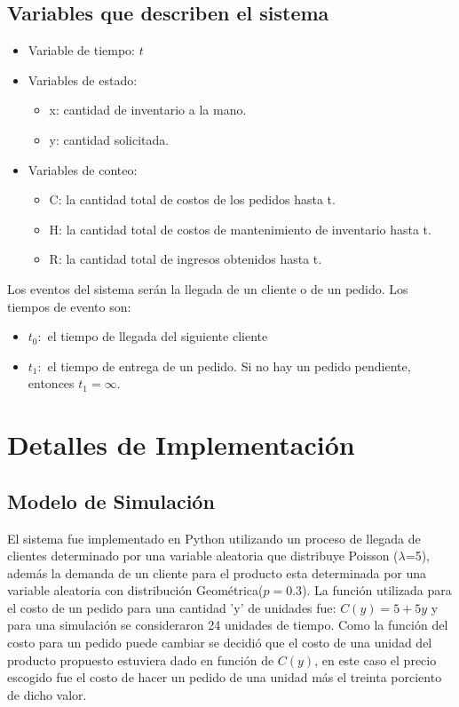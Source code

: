 \documentclass{article}
\begin{document}
\subsection{Variables que describen el sistema}
\begin{itemize}
    \item Variable de tiempo: $t$
    \item Variables de estado:
          \begin{itemize}
            \item x: cantidad de inventario a la mano.
            \item y: cantidad solicitada.
          \end{itemize}
    \item Variables de conteo:
          \begin{itemize}
            \item C: la cantidad total de costos de los pedidos hasta t.
            \item H: la cantidad total de costos de mantenimiento de inventario hasta t.
            \item R: la cantidad total de ingresos obtenidos hasta t.
          \end{itemize}

\end{itemize}

Los eventos del sistema serán la llegada de un cliente o de un pedido. 
Los tiempos de evento son:
\begin{itemize}
    \item $t_0:$ el tiempo de llegada del siguiente cliente
    \item $t_1:$ el tiempo de entrega de un pedido. Si no hay un pedido pendiente, entonces $t_1 = \infty$.
\end{itemize}

\newpage
\section{Detalles de Implementación}

\subsection{Modelo de Simulación}
El sistema fue implementado en Python utilizando un proceso de llegada de clientes determinado 
por una variable aleatoria que distribuye Poisson ($\lambda$=5), además la demanda de un cliente para el producto
esta determinada por una variable aleatoria con distribución Geométrica($p=0.3$). La función utilizada para el costo
de un pedido para una cantidad 'y' de unidades  fue: $C(y) = 5 + 5y$ y para una simulación se consideraron 24 unidades de tiempo.
Como la función del costo para un pedido puede cambiar se decidió que el costo de una unidad del producto propuesto estuviera dado en función de $C(y)$, en este caso 
el precio escogido fue el costo de hacer un pedido de una unidad más el treinta porciento de dicho valor.
\end{document}
